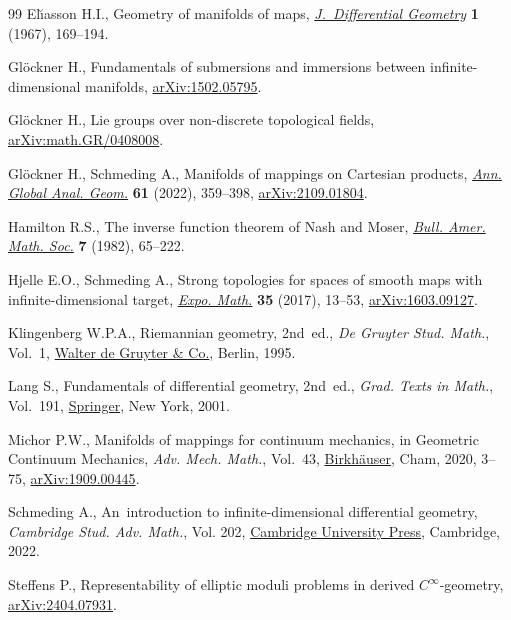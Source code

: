 \documentclass[11pt]{article}
\numberwithin{equation}{section}
\numberwithin{equation}{section}
\begin{document}
\begin{thebibliography}{99}
El\u{\i}asson H.I., Geometry of manifolds of maps,
 \href{https://doi.org/10.4310/jdg/1214427887}{\textit{J.~Differential
 Geometry}} \textbf{1} (1967), 169--194.

Gl\"ockner H., Fundamentals of submersions and immersions between
 infinite-dimensional manifolds,
 \href{http://arxiv.org/abs/1502.05795}{arXiv:1502.05795}.

Gl\"ockner H., Lie groups over non-discrete topological fields,
 \href{http://arxiv.org/abs/math.GR/0408008}{arXiv:math.GR/0408008}.

Gl\"ockner H., Schmeding A., Manifolds of mappings on {C}artesian products,
 \href{https://doi.org/10.1007/s10455-021-09816-y}{\textit{Ann. Global Anal.
 Geom.}} \textbf{61} (2022), 359--398,
 \href{http://arxiv.org/abs/2109.01804}{arXiv:2109.01804}.

Hamilton R.S., The inverse function theorem of {N}ash and {M}oser,
 \href{https://doi.org/10.1090/S0273-0979-1982-15004-2}{\textit{Bull. Amer.
 Math. Soc.}} \textbf{7} (1982), 65--222.

Hjelle E.O., Schmeding A., Strong topologies for spaces of smooth maps with
 infinite-dimensional target,
 \href{https://doi.org/10.1016/j.exmath.2016.07.004}{\textit{Expo. Math.}}
 \textbf{35} (2017), 13--53,
 \href{http://arxiv.org/abs/1603.09127}{arXiv:1603.09127}.

Klingenberg W.P.A., Riemannian geometry, 2nd~ed., \textit{De Gruyter Stud. Math.},
 Vol.~1, \href{https://doi.org/10.1515/9783110905120}{Walter de
 Gruyter \& Co.}, Berlin, 1995.

Lang S., Fundamentals of differential geometry, 2nd~ed., \textit{Grad. Texts in Math.},
 Vol.~191, \href{https://doi.org/10.1007/978-1-4612-0541-8}{Springer}, New
 York, 2001.

Michor P.W., Manifolds of mappings for continuum mechanics, in Geometric
 Continuum Mechanics, \textit{Adv. Mech. Math.}, Vol.~43,
 \href{https://doi.org/10.1007/978-3-030-42683-5_1}{Birkh\"auser}, Cham, 2020,
 3--75, \href{http://arxiv.org/abs/1909.00445}{arXiv:1909.00445}.

Schmeding A., An~introduction to infinite-dimensional differential geometry,
 \textit{Cambridge Stud. Adv. Math.}, Vol. 202,
 \href{https://doi.org/10.1017/9781009091251}{Cambridge University Press},
 Cambridge, 2022.

Steffens P., Representability of elliptic moduli problems in derived
 {$C^{\infty}$}-geometry,
 \href{http://arxiv.org/abs/2404.07931}{arXiv:2404.07931}.

\end{thebibliography}
\end{document}
